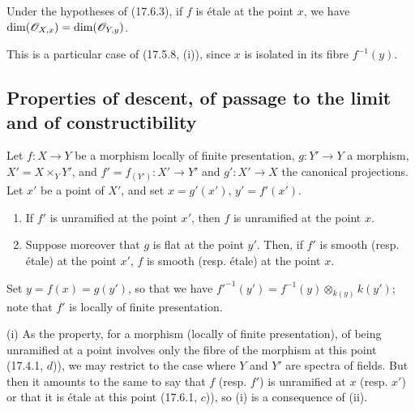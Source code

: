 \begin{proposition}[17.6.4]
\label{IV.17.6.4}
Under the hypotheses of (17.6.3), if $f$ is étale at the point $x$, we have $\dim(\mathscr{O}_{X,x})=\dim(\mathscr{O}_{Y,y})$.
\end{proposition}

This is a particular case of (17.5.8, (i)), since $x$ is isolated in its fibre $f^{-1}(y)$.


\subsection{Properties of descent, of passage to the limit and of constructibility}
\label{IV.17.7}

\begin{proposition}[17.7.1]
\label{IV.17.7.1}
Let $f:X\to Y$ be a morphism locally of finite presentation, $g:Y'\to Y$ a morphism, $X'=X\times_Y Y'$, and $f'=f_{(Y')}:X'\to Y'$ and $g':X'\to X$ the canonical projections. Let $x'$ be a point of $X'$, and set $x=g'(x')$, $y'=f'(x')$.
\begin{enumerate}
  \item[(i)] If $f'$ is unramified at the point $x'$, then $f$ is unramified at the point $x$.
  \item[(ii)] Suppose moreover that $g$ is flat at the point $y'$. Then, if $f'$ is smooth (resp. étale) at the point $x'$, $f$ is smooth (resp. étale) at the point $x$.
\end{enumerate}
\end{proposition}

Set $y=f(x)=g(y')$, so that we have $f'^{-1}(y')=f^{-1}(y)\otimes_{k(y)}k(y')$; note that $f'$ is locally of finite presentation.

(i) As the property, for a morphism (locally of finite presentation), of being unramified at a point involves only the fibre of the morphism at this point (17.4.1, $d$)), we may restrict to the case where $Y$ and $Y'$ are spectra of fields. But then it amounts to the same to say that $f$ (resp. $f'$) is unramified at $x$ (resp. $x'$) or that it is étale at this point (17.6.1, $c$)), so (i) is a consequence of (ii).

